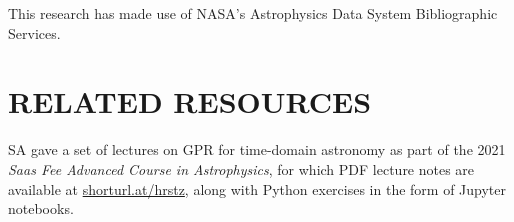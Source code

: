 \documentclass[letterpaper]{ar-1col}
\newcommand{\suz}[1]{\textcolor{magenta}{#1}}
\newcommand{\project}[1]{\textsf{#1}}
\begin{document}
This research has made use of NASA's Astrophysics Data System Bibliographic Services.

%




\section*{RELATED RESOURCES}

SA gave a set of lectures on GPR for time-domain astronomy as part of the 2021 \emph{Saas Fee Advanced Course in Astrophysics}, for which PDF lecture notes are available at \url{shorturl.at/hrstz}, along with \project{Python} exercises in the form of \project{Jupyter} notebooks.
\end{document}
